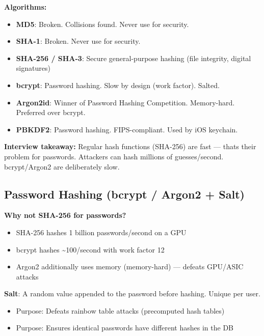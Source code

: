 \documentclass[11pt]{article}
\providecommand{\tightlist}{\setlength{\itemsep}{1pt}\setlength{\parskip}{0pt}}
\begin{document}
\textbf{Algorithms:}

\begin{itemize}
\tightlist
\item
  \textbf{MD5}: Broken. Collisions found. Never use for security.
\item
  \textbf{SHA-1}: Broken. Never use for security.
\item
  \textbf{SHA-256 / SHA-3}: Secure general-purpose hashing (file integrity, digital signatures)
\item
  \textbf{bcrypt}: Password hashing. Slow by design (work factor). Salted.
\item
  \textbf{Argon2id}: Winner of Password Hashing Competition. Memory-hard. Preferred over bcrypt.
\item
  \textbf{PBKDF2}: Password hashing. FIPS-compliant. Used by iOS keychain.
\end{itemize}

\textbf{Interview takeaway:} Regular hash functions (SHA-256) are fast --- that\textquotesingle s their problem for passwords. Attackers can hash millions of guesses/second. bcrypt/Argon2 are deliberately slow.

\subsection{Password Hashing (bcrypt / Argon2 + Salt)}\label{password-hashing-bcrypt--argon2--salt}

\textbf{Why not SHA-256 for passwords?}

\begin{itemize}
\tightlist
\item
  SHA-256 hashes 1 billion passwords/second on a GPU
\item
  bcrypt hashes \textasciitilde100/second with work factor 12
\item
  Argon2 additionally uses memory (memory-hard) --- defeats GPU/ASIC attacks
\end{itemize}

\textbf{Salt}: A random value appended to the password before hashing. Unique per user.

\begin{itemize}
\tightlist
\item
  Purpose: Defeats rainbow table attacks (precomputed hash tables)
\item
  Purpose: Ensures identical passwords have different hashes in the DB
\end{itemize}
\end{document}
